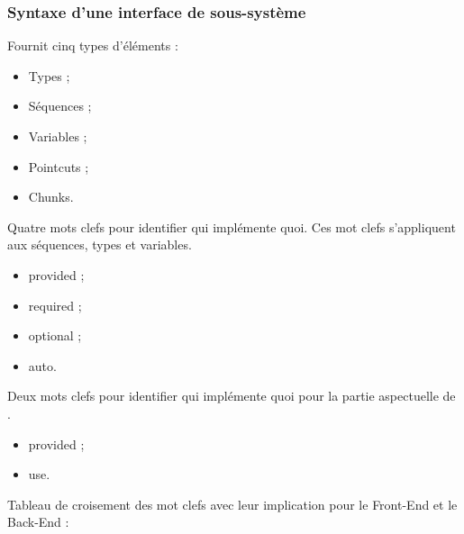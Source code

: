 \documentclass[]{beamer}
\begin{document}
\begin{frame}
\frametitle{Syntaxe d'une interface de sous-système}
 {
    Fournit cinq types d'éléments :
    \begin{itemize}
        \item Types ;
        \item Séquences ;
        \item Variables ;
        \item Pointcuts ;
        \item Chunks.
    \end{itemize}
}
 {
    Quatre mots clefs pour identifier qui implémente quoi.
    Ces mot clefs s'appliquent aux séquences, types et variables.
    \begin{itemize}
        \item provided ;
        \item required ;
        \item optional ;
        \item auto.
    \end{itemize}
}
 {
    Deux mots clefs pour identifier qui implémente quoi pour la partie
    aspectuelle de \rtx.
    \begin{itemize}
        \item provided ;
        \item use.
    \end{itemize}
}
 {
    Tableau de croisement des mot clefs avec leur implication pour le
    Front-End et le Back-End :
}

\end{frame}
\end{document}
